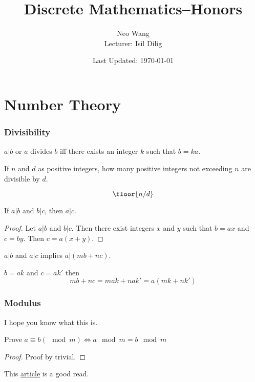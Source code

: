 \documentclass{scrreprt}
\title{Discrete Mathematics--Honors}
\author{Neo Wang\\ Lecturer: Isil Dilig}
\date{Last Updated: \today}
\begin{document}
\maketitle
\tableofcontents



\chapter{Number Theory}

\subsection{Divisibility}

\begin{definition}
	$a|b$ or $a$ divides $b$ iff there exists an integer $k$ such that $b=ka$.
\end{definition}

\begin{example}
	If $n$ and $d$ as positive integers, how many positive integers not exceeding $n$ are divisible by $d$.

	\[
		\floor{n/d}
	\]
\end{example}

\begin{example}
	If $a|b$ and $b|c$, then $a|c$.

	\begin{proof}
		Let $a|b$ and $b|c$. Then there exist integers $x$ and $y$ such that $b = ax$ and $c = by$. Then $c = a(x+y)$.
	\end{proof}
\end{example}

\begin{example}
	$a|b$ and $a|c$ implies $a|(mb + nc)$.

	$b=ak$ and $c=ak'$ then \[
		mb+nc=mak+nak'=a(mk+nk')
	\]
\end{example}

\subsection{Modulus}

I hope you know what this is.

\begin{example}
	Prove $a\equiv b (\mod m)\iff a\mod m = b \mod m$

	\begin{proof}
		Proof by trivial.
	\end{proof}
\end{example}

\begin{remark}
	This \href{https://www.math.cmu.edu/~mradclif/teaching/127S19/Notes/Infinite%20Cardinality.pdf}{article} is a good read.
\end{remark}
\end{document}
